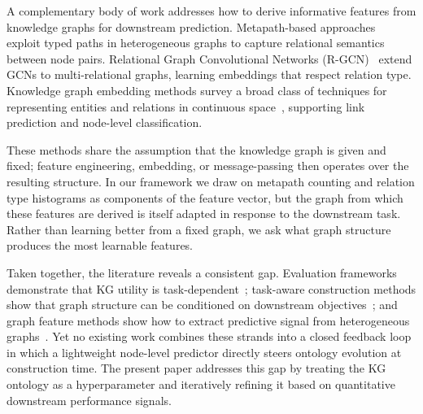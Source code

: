 A complementary body of work addresses how to derive informative features from knowledge
graphs for downstream prediction. Metapath-based approaches~\cite{sun2011pathsim,
dong2017metapath2vec} exploit typed paths in heterogeneous graphs to capture relational
semantics between node pairs. Relational Graph Convolutional Networks
(R-GCN)~\cite{schlichtkrull2018rgcn} extend GCNs to multi-relational graphs, learning
embeddings that respect relation type. Knowledge graph embedding methods survey a broad
class of techniques for representing entities and relations in continuous
space~\cite{wang2017kgsurvey, ji2021kgcompletion}, supporting link prediction and
node-level classification.

These methods share the assumption that the knowledge graph is given and fixed; feature
engineering, embedding, or message-passing then operates over the resulting structure. In
our framework we draw on metapath counting and relation type histograms as components of
the feature vector, but the graph from which these features are derived is itself adapted
in response to the downstream task. Rather than learning better from a fixed
graph, we ask what graph structure produces the most learnable features.

Taken together, the literature reveals a consistent gap. Evaluation frameworks demonstrate
that KG utility is task-dependent~\cite{heist2023kgreat, bloem2021kgbench}; task-aware
construction methods show that graph structure can be conditioned on downstream
objectives~\cite{cucumides2025augraph}; and graph feature methods show how to extract
predictive signal from heterogeneous graphs~\cite{sun2011pathsim, schlichtkrull2018rgcn}.
Yet no existing work combines these strands into a closed feedback loop in which a
lightweight node-level predictor directly steers ontology evolution at construction time.
The present paper addresses this gap by treating the KG ontology as a hyperparameter
and iteratively refining it based on quantitative downstream performance signals.
